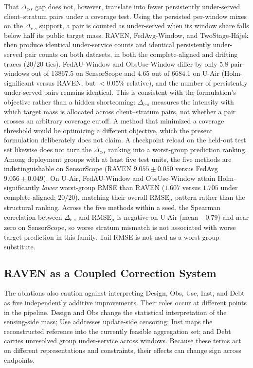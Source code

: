 \documentclass[letterpaper,journal]{IEEEtran}
\begin{document}
That $\Delta_{c\text{-}s}$ gap does not, however, translate into fewer
persistently under-served client--stratum pairs under a coverage test.
Using the persisted per-window mixes on the $\Delta_{c\text{-}s}$ support,
a pair is counted as under-served when its window share falls below half
its public target mass.  RAVEN, FedAvg-Window, and TwoStage-H\'ajek then
produce identical under-service counts and identical persistently
under-served pair counts on both datasets, in both the complete-aligned and
drifting traces (20/20 ties).  FedAU-Window and ObsUse-Window differ by only
$5.8$ pair-windows out of $13867.5$ on SensorScope and $4.65$ out of
$6684.1$ on U-Air (Holm-significant versus RAVEN, but $<0.05\%$ relative),
and the number of persistently under-served pairs remains identical.
This is consistent with the formulation's objective rather than a hidden
shortcoming: $\Delta_{c\text{-}s}$ measures the intensity with which target
mass is allocated across client--stratum pairs, not whether a pair crosses an
arbitrary coverage cutoff.  A method that minimized a coverage threshold
would be optimizing a different objective, which the present formulation
deliberately does not claim.
A checkpoint reload on the held-out test set likewise does not turn the
$\Delta_{c\text{-}s}$ ranking into a worst-group prediction ranking.
Among deployment groups with at least five test units, the five methods are
indistinguishable on SensorScope (RAVEN $9.055\pm0.050$ versus FedAvg
$9.056\pm0.049$).  On U-Air, FedAU-Window and ObsUse-Window attain
Holm-significantly \emph{lower} worst-group RMSE than RAVEN
($1.607$ versus $1.705$ under complete-aligned; $20/20$), matching their
overall $\mathrm{RMSE}_{\mu}$ pattern rather than the structural ranking.
Across the five methods within a seed, the Spearman correlation between
$\Delta_{c\text{-}s}$ and $\mathrm{RMSE}_{\mu}$ is negative on U-Air
(mean $-0.79$) and near zero on SensorScope, so worse stratum mismatch is
not associated with worse target prediction in this family.
Tail RMSE is not used as a worst-group substitute.

\subsection{RAVEN as a Coupled Correction System}
\label{subsec:discussion_components}

The ablations also caution against interpreting Design, Obs, Use, Inst, and
Debt as five independently additive improvements.  Their roles occur at
different points in the pipeline.  Design and Obs change the statistical
interpretation of the sensing-side mass; Use addresses update-side censoring;
Inst maps the reconstructed reference into the currently feasible aggregation
set; and Debt carries unresolved group under-service across windows.  Because
these terms act on different representations and constraints, their effects can
change sign across endpoints.
\end{document}
